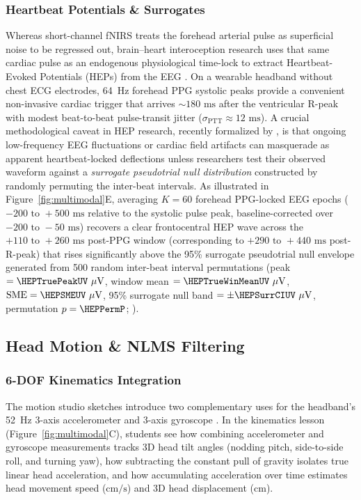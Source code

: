 \documentclass[11pt]{article}
\begin{document}
\subsubsection{Heartbeat Potentials \& Surrogates}
Whereas short-channel fNIRS treats the forehead arterial pulse as superficial noise to be regressed out, brain--heart interoception research uses that same cardiac pulse as an endogenous physiological time-lock to extract Heartbeat-Evoked Potentials (HEPs) from the EEG \citep{makowski2021neurokit2,cannard2024brainbeats,steinfath2025validating}. On a wearable headband without chest ECG electrodes, 64~Hz forehead PPG systolic peaks provide a convenient non-invasive cardiac trigger that arrives $\sim 180\text{ ms}$ after the ventricular R-peak with modest beat-to-beat pulse-transit jitter ($\sigma_{\text{PTT}} \approx 12\text{ ms}$). A crucial methodological caveat in HEP research, recently formalized by \citet{steinfath2025validating}, is that ongoing low-frequency EEG fluctuations or cardiac field artifacts can masquerade as apparent heartbeat-locked deflections unless researchers test their observed waveform against a \emph{surrogate pseudotrial null distribution} constructed by randomly permuting the inter-beat intervals. As illustrated in Figure~\ref{fig:multimodal}E, averaging $K = 60$ forehead PPG-locked EEG epochs ($-200\text{ to }+500\text{ ms}$ relative to the systolic pulse peak, baseline-corrected over $-200\text{ to }-50\text{ ms}$) recovers a clear frontocentral HEP wave across the $+110\text{ to }+260\text{ ms}$ post-PPG window (corresponding to $+290\text{ to }+440\text{ ms}$ post-R-peak) that rises significantly above the 95\% surrogate pseudotrial null envelope generated from 500 random inter-beat interval permutations (peak $= \HEPTruePeakUV\ \mu\text{V}$, window mean $= \HEPTrueWinMeanUV\ \mu\text{V}$, $\text{SME} = \HEPSMEUV\ \mu\text{V}$, 95\% surrogate null band $= \pm \HEPSurrCIUV\ \mu\text{V}$, permutation $p = \HEPPermP$; \citealp{cannard2024brainbeats,steinfath2025validating}).

\subsection{Head Motion \& NLMS Filtering}

\subsubsection{6-DOF Kinematics Integration}
The motion studio sketches introduce two complementary uses for the headband's 52~Hz 3-axis accelerometer and 3-axis gyroscope \citep{rosanne2021adaptive,klug2022bemobil}. In the kinematics lesson (Figure~\ref{fig:multimodal}C), students see how combining accelerometer and gyroscope measurements tracks 3D head tilt angles (nodding pitch, side-to-side roll, and turning yaw), how subtracting the constant pull of gravity isolates true linear head acceleration, and how accumulating acceleration over time estimates head movement speed ($\text{cm/s}$) and 3D head displacement ($\text{cm}$).
\end{document}
